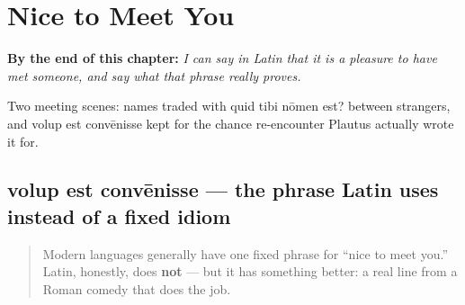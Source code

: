 
\chapter{Nice to Meet You}
\label{ch:la-nice-to-meet-you}

\begin{chapteropening}
\textbf{By the end of this chapter:} \emph{I can say in Latin that it is a pleasure to have met someone, and say what that phrase really proves.}

Two meeting scenes: names traded with quid tibi nōmen est? between strangers, and volup est convēnisse kept for the chance re-encounter Plautus actually wrote it for.
\end{chapteropening}

\section[volup est convēnisse]{volup est convēnisse — the phrase Latin uses instead of a fixed idiom}

\label{lesson:LA-C21-volup-est-convenisse}



\begin{quote}
Modern languages generally have one fixed phrase for \textquotedblleft{}nice to meet you.\textquotedblright{} Latin, honestly, does \textbf{not} — but it has something better: a real line from a Roman comedy that does the job.
\end{quote}

